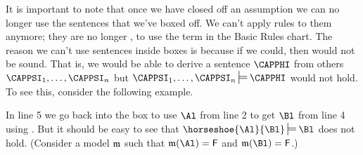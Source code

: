 It is important to note that once we have closed off an assumption we can no longer use the sentences that we've boxed off. 
We can't apply rules to them anymore; they are no longer , to use the term in the Basic Rules chart.
The reason we can't use sentences inside boxes is because if we could, then \GSD{} would not be sound.
That is, we would be able to derive a sentence $\CAPPHI$ from others $\CAPPSI_1,\ldots,\CAPPSI_{\integer{n}}$ but $\CAPPSI_1,\ldots,\CAPPSI_{\integer{n}}\sdtstile{}{}\CAPPHI$ would not hold.
To see this, consider the following example.
\begin{gproof}
\end{gproof}
\noindent{}In line 5 we go back into the box to use $\Al$ from line 2 to get $\Bl$ from line 4 using . 
But it should be easy to see that $\horseshoe{\Al}{\Bl}\sdtstile{}{}\Bl$ does not hold. 
(Consider a model $\mathfrak{m}$ such that $\IntA(\Al)=\FalseB$ and $\IntA(\Bl)=\FalseB$.) 

